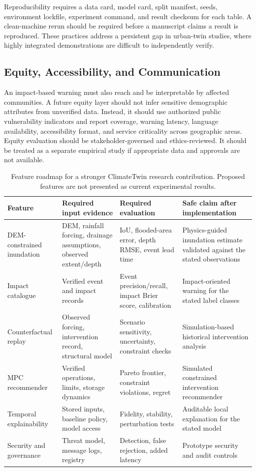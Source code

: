 \documentclass[journal]{IEEEtran}
\begin{document}
Reproducibility requires a data card, model card, split manifest, seeds, environment lockfile, experiment command, and result checksum for each table. A clean-machine rerun should be required before a manuscript claims a result is reproduced. These practices address a persistent gap in urban-twin studies, where highly integrated demonstrations are difficult to independently verify.

\subsection{Equity, Accessibility, and Communication}
An impact-based warning must also reach and be interpretable by affected communities. A future equity layer should not infer sensitive demographic attributes from unverified data. Instead, it should use authorized public vulnerability indicators and report coverage, warning latency, language availability, accessibility format, and service criticality across geographic areas. Equity evaluation should be stakeholder-governed and ethics-reviewed. It should be treated as a separate empirical study if appropriate data and approvals are not available.

\begin{table}[t]
\caption{Feature roadmap for a stronger ClimateTwin research contribution. Proposed features are not presented as current experimental results.}
\label{tab:roadmap}
\centering\footnotesize
\begin{tabular}{p{}p{}p{}p{}}
\toprule
Feature & Required input evidence & Required evaluation & Safe claim after implementation \\
\midrule
DEM-constrained inundation & DEM, rainfall forcing, drainage assumptions, observed extent/depth & IoU, flooded-area error, depth RMSE, event lead time & Physics-guided inundation estimate validated against the stated observations \\
Impact catalogue & Verified event and impact records & Event precision/recall, impact Brier score, calibration & Impact-oriented warning for the stated label classes \\
Counterfactual replay & Observed forcing, intervention record, structural model & Scenario sensitivity, uncertainty, constraint checks & Simulation-based historical intervention analysis \\
MPC recommender & Verified operations, limits, storage dynamics & Pareto frontier, constraint violations, regret & Simulated constrained intervention recommender \\
Temporal explainability & Stored inputs, baseline policy, model access & Fidelity, stability, perturbation tests & Auditable local explanation for the stated model \\
Security and governance & Threat model, message logs, registry & Detection, false rejection, added latency & Prototype security and audit controls \\
\bottomrule
\end{tabular}
\end{table}
\end{document}
